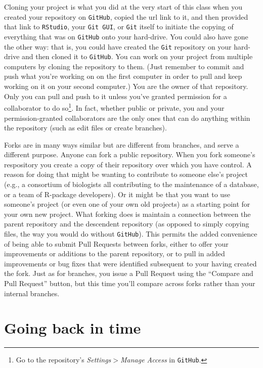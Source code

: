 \documentclass[12pt,letterpaper]{article}
\begin{document}
Cloning your project is what you did at the very start of this class when you created your repository on \texttt{GitHub}, copied the url link to it, and then provided that link to \texttt{RStudio}, your \texttt{Git GUI}, or \texttt{Git} itself to initiate the copying of everything that was on \texttt{GitHub} onto your hard-drive.
You could also have gone the other way:  that is, you could have created the 
\texttt{Git} repository on your hard-drive and then cloned it to \texttt{GitHub}.
You can work on your project from multiple computers by cloning the repository to them.
(Just remember to commit and push what you're working on on the first computer in order to pull and keep working on it on your second computer.)
You are the owner of that repository.
Only you can pull and push to it unless you've granted permission for a 
collaborator to do so\footnote{Go to the repository's \emph{Settings$>$Manage 
Access} in \texttt{GitHub}.}.
In fact, whether public or private, you and your permission-granted 
collaborators are the only ones that can do anything within the repository
(such as edit files or create branches).

Forks are in many ways similar but are different from branches, and serve a different purpose.
Anyone can fork a public repository.
When you fork someone's respository you create a copy of their repository over which you have control.
A reason for doing that might be wanting to contribute to someone else's project (e.g., a consortium of biologists all contributing to the maintenance of a database, or a team of R-package developers).
Or it might be that you want to use someone's project (or even one of your own old projects) as a starting point for your own new project.
What forking does is maintain a connection between the parent repository and the  descendent repository (as opposed to simply copying files, the way you would do without \texttt{GitHub}).
This permits the added convenience of being able to submit Pull Requests 
between forks, either to offer your improvements or additions to the parent 
repository, or to pull in added improvements or bug fixes that were identified 
subsequent to your having created the fork.
Just as for branches, you issue a Pull Request using the ``Compare and Pull Request'' button, but this time you'll compare across forks rather than your internal branches.



\section{Going back in time}
\end{document}
